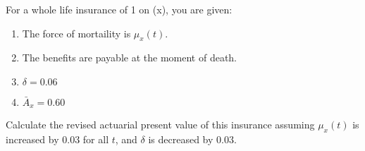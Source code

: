 For a whole life insurance of 1 on (x), you are given:
\begin{enumerate}
     \item The force of mortaility is $\mu_x(t)$. 
     \item The benefits are payable at the moment of death.
     \item $\delta = 0.06$
     \item ${\bar{A}}_{x} = 0.60$
\end{enumerate}
Calculate the revised actuarial present value of this insurance assuming $\mu_x(t)$ is increased by $0.03$ for all $t$, and $\delta$ is decreased by $0.03.$


